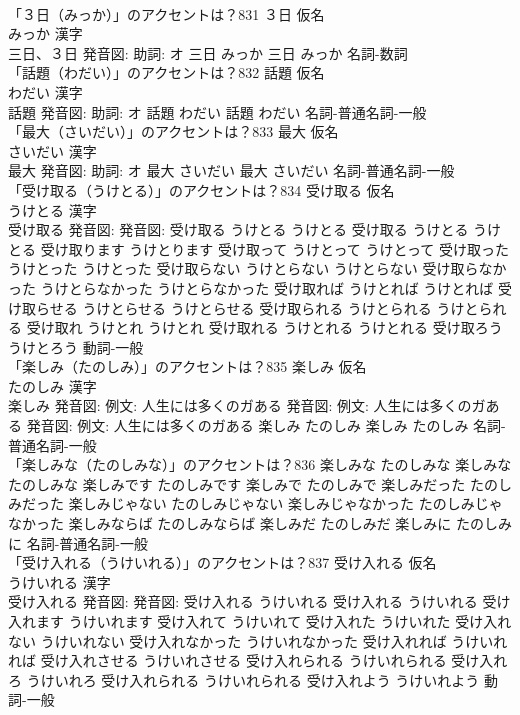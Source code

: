 \documentclass[8pt]{extreport}
\begin{document}
\begin{CJK}{UTF8}{min}
\\	「３日（みっか）」のアクセントは？831	３日 仮名　
\\	みっか 漢字　
\\	三日、３日 発音図: 助詞: オ	三日 みっか		三日 みっか				名詞-数詞 
\\	「話題（わだい）」のアクセントは？832	話題 仮名　
\\	わだい 漢字　
\\	話題 発音図: 助詞: オ	話題 わだい		話題 わだい				名詞-普通名詞-一般 
\\	「最大（さいだい）」のアクセントは？833	最大 仮名　
\\	さいだい 漢字　
\\	最大 発音図: 助詞: オ	最大 さいだい		最大 さいだい				名詞-普通名詞-一般 
\\	「受け取る（うけとる）」のアクセントは？834	受け取る 仮名　
\\	うけとる 漢字　
\\	受け取る 発音図: 発音図:	受け取る うけとる うけとる		受け取る うけとる うけとる 受け取ります うけとります 受け取って うけとって うけとって 受け取った うけとった うけとった 受け取らない うけとらない うけとらない 受け取らなかった うけとらなかった うけとらなかった 受け取れば うけとれば うけとれば 受け取らせる うけとらせる うけとらせる 受け取られる うけとられる うけとられる 受け取れ うけとれ うけとれ 受け取れる うけとれる うけとれる 受け取ろう うけとろう				動詞-一般 
\\	「楽しみ（たのしみ）」のアクセントは？835	楽しみ 仮名　
\\	たのしみ 漢字　
\\	楽しみ 発音図: 例文: 人生には多くのガある 発音図: 例文: 人生には多くのガある 発音図: 例文: 人生には多くのガある	楽しみ たのしみ		楽しみ たのしみ				名詞-普通名詞-一般 
\\	「楽しみな（たのしみな）」のアクセントは？836		楽しみな たのしみな		楽しみな たのしみな 楽しみです たのしみです 楽しみで たのしみで 楽しみだった たのしみだった 楽しみじゃない たのしみじゃない 楽しみじゃなかった たのしみじゃなかった 楽しみならば たのしみならば 楽しみだ たのしみだ 楽しみに たのしみに				名詞-普通名詞-一般 
\\	「受け入れる（うけいれる）」のアクセントは？837	受け入れる 仮名　
\\	うけいれる 漢字　
\\	受け入れる 発音図: 発音図:	受け入れる うけいれる		受け入れる うけいれる 受け入れます うけいれます 受け入れて うけいれて 受け入れた うけいれた 受け入れない うけいれない 受け入れなかった うけいれなかった 受け入れれば うけいれれば 受け入れさせる うけいれさせる 受け入れられる うけいれられる 受け入れろ うけいれろ 受け入れられる うけいれられる 受け入れよう うけいれよう				動詞-一般 

\end{CJK}
\end{document}
